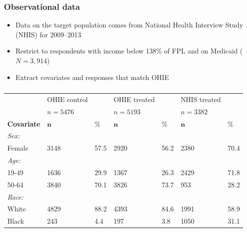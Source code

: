 \documentclass{beamer}
\begin{document}
\begin{frame}
\frametitle{Observational data}
\begin{itemize}
\item Data on the target population comes from National Health Interview Study (NHIS) \cite{NHIS} for 2009--2013
\item Restrict to respondents with income below 138\% of FPL and on Medicaid ($N=3,914$)
\item Extract covariates and responses that match OHIE
\end{itemize}
\end{frame}

\begin{frame}
\frametitle{}
{\tiny
\begin{singlespace}
\begin{landscape}
\begin{longtable}{lllllll}
  & OHIE control &  & OHIE treated &  & NHIS treated&  \\ 
  & $n=5476$ &  & $n=5193$ &  & $n=3382$ &  \\  
  \hline   
    \hline   
 \textbf{Covariate} &  $\mathbf{n}$ & $\mathbf{\%}$ & $\mathbf{n}$ & $\mathbf{\%}$ & $\mathbf{n}$ & $\mathbf{\%}$ \\ 
\hline
\textit{Sex:} &  & & &  &  & \\ 

\hspace{3mm} Female & 3148 & 57.5 & 2920 & 56.2 & 2380 & 70.4 \\ 
\textit{Age:} &  & & &  &  & \\ 
\hspace{3mm}19-49 & 1636 & 29.9 & 1367 & 26.3 & 2429 & 71.8  \\ 

\hspace{3mm}50-64 & 3840 & 70.1 & 3826 & 73.7 & 953 & 28.2 \\ 
\textit{Race:} &  & & &  &  & \\ 
\hspace{3mm}White & 4829 & 88.2 & 4393 & 84.6 & 1991 & 58.9  \\ 

\hspace{3mm}Black & 243 & 4.4 & 197 & 3.8 & 1050 & 31.1  \\ 


\end{longtable}
\end{landscape}
\end{singlespace}}
\end{frame}
\end{document}
